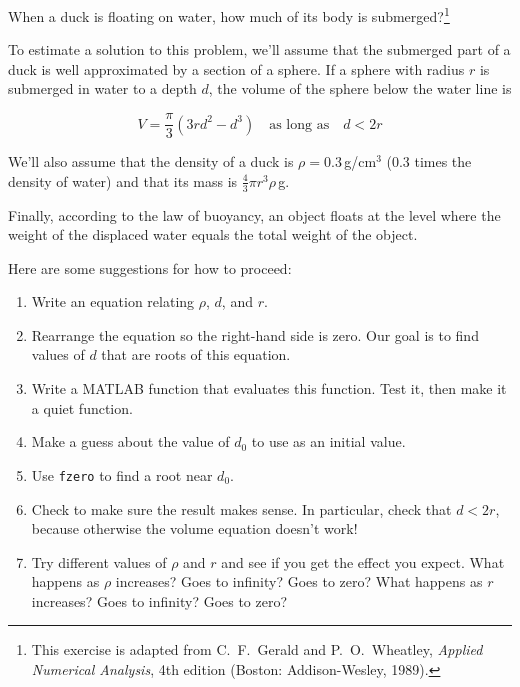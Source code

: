 \begin{ex}
\label{duck}

When a duck is floating on water, how much of its body is submerged?\footnote{This exercise is adapted from C.~F.~Gerald and P.~O.~Wheatley, \emph{Applied Numerical Analysis}, 4th edition (Boston: Addison-Wesley, 1989).}


To estimate a solution to this problem, we'll assume that the submerged part of a duck is well approximated by a section of a sphere.
If a sphere with radius $r$ is submerged in water to a depth $d$, the
volume of the sphere below the water line is

\[ V = \frac{\pi}{3} (3r d^2 - d^3) \quad
\mbox{as long as} \quad d < 2 r  \]

We'll also assume that the density of a duck is $\rho = 0.3$\,g/cm$^3$ (0.3 times the density of water) and that its mass is $\frac{4}{3} \pi r^3 \rho$\,g.

Finally, according to the law of buoyancy, an object floats at the level where the weight of the displaced water equals the total weight of the object.


Here are some suggestions for how to proceed:

\begin{enumerate}

\item Write an equation relating $\rho$, $d$, and $r$.

\item Rearrange the equation so the right-hand side is zero.
Our goal is to find values of $d$ that are roots of this equation.

\item Write a MATLAB function that evaluates this function.  Test it,
   then make it a quiet function.

\item Make a guess about the value of $d_0$ to use as an initial value.

\item Use \lstinline{fzero} to find a root near $d_0$.

\item Check to make sure the result makes sense.  In particular,
   check that $d < 2 r$, because otherwise the volume equation
   doesn't work!

\item Try different values of $\rho$ and $r$ and see if you get the
  effect you expect.  What happens as $\rho$ increases?  Goes to
  infinity?  Goes to zero?  What happens as $r$ increases?  Goes to
  infinity?  Goes to zero?

\end{enumerate}




\end{ex}
